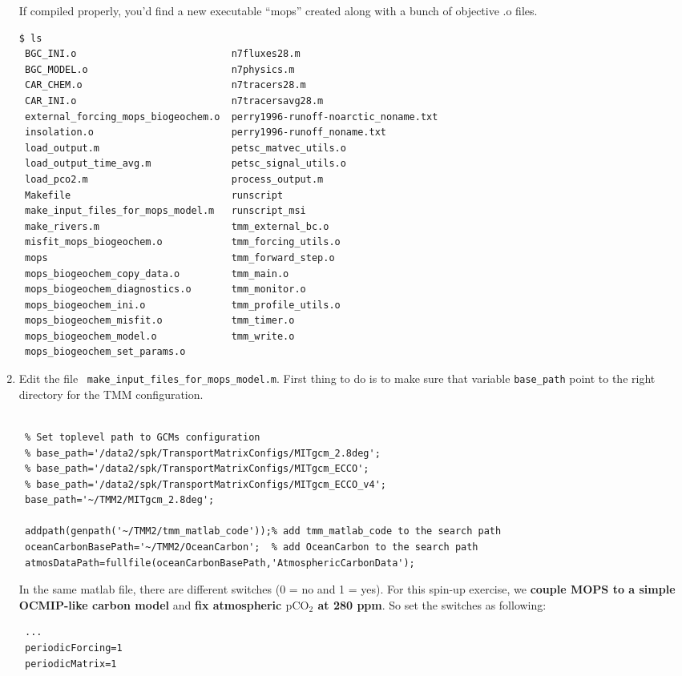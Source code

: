 \documentclass[a4paper]{article}
\def\noin{\noindent }
\begin{document}
\begin{enumerate}
\noin If compiled properly, you'd find a new executable ``mops'' created along with a bunch of objective .o files. 
\begin{lstlisting}[style=DOS]
 $ ls
 BGC_INI.o                           n7fluxes28.m
 BGC_MODEL.o                         n7physics.m
 CAR_CHEM.o                          n7tracers28.m
 CAR_INI.o                           n7tracersavg28.m
 external_forcing_mops_biogeochem.o  perry1996-runoff-noarctic_noname.txt
 insolation.o                        perry1996-runoff_noname.txt
 load_output.m                       petsc_matvec_utils.o
 load_output_time_avg.m              petsc_signal_utils.o
 load_pco2.m                         process_output.m
 Makefile                            runscript
 make_input_files_for_mops_model.m   runscript_msi
 make_rivers.m                       tmm_external_bc.o
 misfit_mops_biogeochem.o            tmm_forcing_utils.o
 mops                                tmm_forward_step.o
 mops_biogeochem_copy_data.o         tmm_main.o
 mops_biogeochem_diagnostics.o       tmm_monitor.o
 mops_biogeochem_ini.o               tmm_profile_utils.o
 mops_biogeochem_misfit.o            tmm_timer.o
 mops_biogeochem_model.o             tmm_write.o
 mops_biogeochem_set_params.o
\end{lstlisting}

\item Edit the file \ \verb/make_input_files_for_mops_model.m/. First thing to do is to make sure that variable \verb/base_path/ point to the right directory for the TMM configuration.
\lstset{language=matlab} 
\begin{lstlisting}[frame=single,basicstyle=\scriptsize,commentstyle=\color{blue}]
 % make_input_files_for_mops_model.m
 
 % Set toplevel path to GCMs configuration
 % base_path='/data2/spk/TransportMatrixConfigs/MITgcm_2.8deg';
 % base_path='/data2/spk/TransportMatrixConfigs/MITgcm_ECCO';
 % base_path='/data2/spk/TransportMatrixConfigs/MITgcm_ECCO_v4';
 base_path='~/TMM2/MITgcm_2.8deg';
 
 addpath(genpath('~/TMM2/tmm_matlab_code'));% add tmm_matlab_code to the search path
 oceanCarbonBasePath='~/TMM2/OceanCarbon';  % add OceanCarbon to the search path
 atmosDataPath=fullfile(oceanCarbonBasePath,'AtmosphericCarbonData');
\end{lstlisting}
\noin In the same matlab file, there are different switches (0 = no and 1 = yes). For this spin-up exercise, we \textbf{couple MOPS to a simple OCMIP-like carbon model} and \textbf{fix atmospheric $\mathrm{pCO_{2}}$ at 280 ppm}. So set the switches as following:
\begin{lstlisting}[frame=single,basicstyle=\scriptsize,commentstyle=\color{blue}]
 % make_input_files_for_mops_model.m
 ...
 periodicForcing=1 
 periodicMatrix=1
 

\end{lstlisting}
\end{enumerate}
\end{document}
